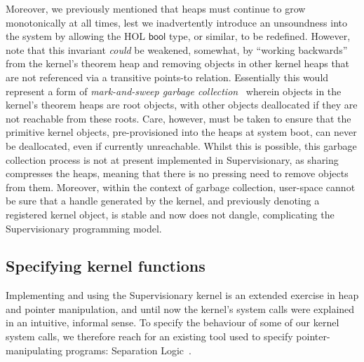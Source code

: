 \documentclass[a4paper, UKenglish, cleveref, autoref, thm-restate, colorlinks]{lipics-v2021}
\begin{document}
Moreover, we previously mentioned that heaps must continue to grow monotonically at all times, lest we inadvertently introduce an unsoundness into the system by allowing the HOL $\mathsf{bool}$ type, or similar, to be redefined.
However, note that this invariant \emph{could} be weakened, somewhat, by ``working backwards'' from the kernel's theorem heap and removing objects in other kernel heaps that are not referenced via a transitive points-to relation.
Essentially this would represent a form of \emph{mark-and-sweep garbage collection}~\cite{DBLP:books/crc/CRCcompiler2007/SanyalK07} wherein objects in the kernel's theorem heaps are root objects, with other objects deallocated if they are not reachable from these roots.
Care, however, must be taken to ensure that the primitive kernel objects, pre-provisioned into the heaps at system boot, can never be deallocated, even if currently unreachable.
Whilst this is possible, this garbage collection process is not at present implemented in Supervisionary, as sharing compresses the heaps, meaning that there is no pressing need to remove objects from them.
Moreover, within the context of garbage collection, user-space cannot be sure that a handle generated by the kernel, and previously denoting a registered kernel object, is stable and now does not dangle, complicating the Supervisionary programming model.

\subsection{Specifying kernel functions}
\label{subsect.specifying.kernel.functions}

Implementing and using the Supervisionary kernel is an extended exercise in heap and pointer manipulation, and until now the kernel's system calls were explained in an intuitive, informal sense.
To specify the behaviour of some of our kernel system calls, we therefore reach for an existing tool used to specify pointer-manipulating programs: Separation Logic~\cite{DBLP:conf/lics/Reynolds02, DBLP:conf/popl/IshtiaqO01}.
\end{document}
